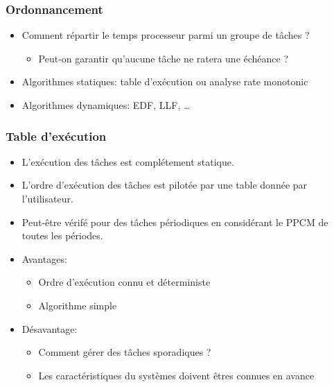 \documentclass[ignorenonframetext,]{beamer}
\begin{document}
\begin{frame}\frametitle{Ordonnancement}

\begin{itemize}
\item
  Comment répartir le temps processeur parmi un groupe de tâches ?

  \begin{itemize}
  \item
    Peut-on garantir qu'aucune tâche ne ratera une échéance ?\\
  \end{itemize}
\item
  Algorithmes statiques: table d'exécution ou analyse rate monotonic
\item
  Algorithmes dynamiques: EDF, LLF, \ldots{}
\end{itemize}

\end{frame}

\begin{frame}\frametitle{Table d'exécution}

\begin{itemize}
\item
  L'exécution des tâches est complétement statique.
\item
  L'ordre d'exécution des tâches est pilotée par une table donnée par
  l'utilisateur.
\item
  Peut-être vérifé pour des tâches périodiques en considérant le PPCM de
  toutes les périodes.
\item
  Avantages:

  \begin{itemize}
  \item
    Ordre d'exécution connu et déterministe
  \item
    Algorithme simple
  \end{itemize}
\item
  Désavantage:

  \begin{itemize}
  \item
    Comment gérer des tâches sporadiques ?
  \item
    Les caractéristiques du systèmes doivent êtres connues en avance
  \end{itemize}
\end{itemize}

\end{frame}
\end{document}
